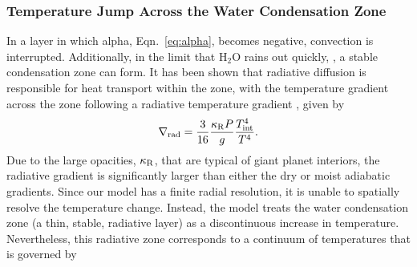 \documentclass[11pt]{ucscthesisbs}
\begin{document}
\subsubsection{Temperature Jump Across the Water Condensation Zone}
In a layer in which alpha, Eqn.~\ref{eq:alpha}, becomes negative, convection is interrupted. Additionally, in the limit that H$_{2}$O rains out quickly, \citep{friedson_2017,leconte_2017}, a stable condensation zone can form. It has been shown that radiative diffusion is responsible for heat transport within the zone, with the temperature gradient across the zone following a radiative temperature gradient \citep{kippenhahn_2012} , given by
\begin{align}
 \nabla_{\rm rad}= \frac{3}{16}\frac{\kappa_{\rm R} P}{g}\frac{T_{\rm int}^4}{T^4} .
  \label{eq:radiative_gradient}
\end{align}
Due to the large opacities, $\kappa_{\rm R}$, that are typical of giant planet interiors, the radiative gradient is significantly larger than either the dry or moist adiabatic gradients. Since our model has a finite radial resolution, it is unable to spatially resolve the temperature change. Instead, the model treats the water condensation zone (a thin, stable, radiative layer) as a discontinuous increase in temperature. Nevertheless, this radiative zone corresponds to a continuum of temperatures that is governed by
\end{document}
